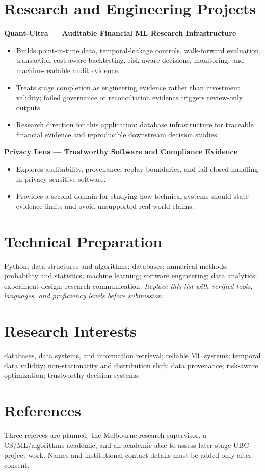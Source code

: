 \documentclass[11pt]{article}
\begin{document}
\section*{Research and Engineering Projects}
\textbf{Quant-Ultra --- Auditable Financial ML Research Infrastructure}
\begin{itemize}
\item Builds point-in-time data, temporal-leakage controls, walk-forward evaluation, transaction-cost-aware backtesting, risk-aware decisions, monitoring, and machine-readable audit evidence.
\item Treats stage completion as engineering evidence rather than investment validity; failed governance or reconciliation evidence triggers review-only outputs.
\item Research direction for this application: database infrastructure for traceable financial evidence and reproducible downstream decision studies.
\end{itemize}

\begin{samepage}
\textbf{Privacy Lens --- Trustworthy Software and Compliance Evidence}
\begin{itemize}
\item Explores auditability, provenance, replay boundaries, and fail-closed handling in privacy-sensitive software.
\item Provides a second domain for studying how technical systems should state evidence limits and avoid unsupported real-world claims.
\end{itemize}
\end{samepage}

\section*{Technical Preparation}
Python; data structures and algorithms; databases; numerical methods; probability and statistics; machine learning; software engineering; data analytics; experiment design; research communication. \textit{Replace this list with verified tools, languages, and proficiency levels before submission.}

\section*{Research Interests}
databases, data systems, and information retrieval; reliable ML systems; temporal data validity; non-stationarity and distribution shift; data provenance; risk-aware optimization; trustworthy decision systems.

\section*{References}
Three referees are planned: the Melbourne research supervisor, a CS/ML/algorithms academic, and an academic able to assess later-stage UBC project work. Names and institutional contact details must be added only after consent.
\end{document}
